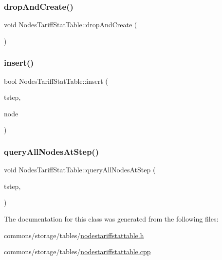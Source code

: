 \subsubsection{\texorpdfstring{dropAndCreate()}{dropAndCreate()}}
{\footnotesize\ttfamily void Nodes\+Tariff\+Stat\+Table\+::drop\+And\+Create (\begin{DoxyParamCaption}{ }\end{DoxyParamCaption})}

\mbox{\label{class_nodes_tariff_stat_table_aa49c757faf0d644ab61d4a48e90cb13f}} 
\subsubsection{\texorpdfstring{insert()}{insert()}}
{\footnotesize\ttfamily bool Nodes\+Tariff\+Stat\+Table\+::insert (\begin{DoxyParamCaption}\item[{int}]{tstep,  }\item[{\mbox{\hyperlink{class_node}{Node}} $\ast$}]{node }\end{DoxyParamCaption})}

\mbox{\label{class_nodes_tariff_stat_table_a4d70bfc71c6a79dae6bd846a9f1aeb51}} 
\subsubsection{\texorpdfstring{queryAllNodesAtStep()}{queryAllNodesAtStep()}}
{\footnotesize\ttfamily void Nodes\+Tariff\+Stat\+Table\+::query\+All\+Nodes\+At\+Step (\begin{DoxyParamCaption}\item[{int}]{tstep,  }\item[{std\+::function$<$ bool(\mbox{\hyperlink{struct_nodes_tariff_stat_table_1_1_node_tariff_stat}{Node\+Tariff\+Stat}} stat)$>$}]{ }\end{DoxyParamCaption})}



The documentation for this class was generated from the following files\+:\begin{DoxyCompactItemize}
\item 
commons/storage/tables/\mbox{\hyperlink{nodestariffstattable_8h}{nodestariffstattable.\+h}}\item 
commons/storage/tables/\mbox{\hyperlink{nodestariffstattable_8cpp}{nodestariffstattable.\+cpp}}\end{DoxyCompactItemize}
